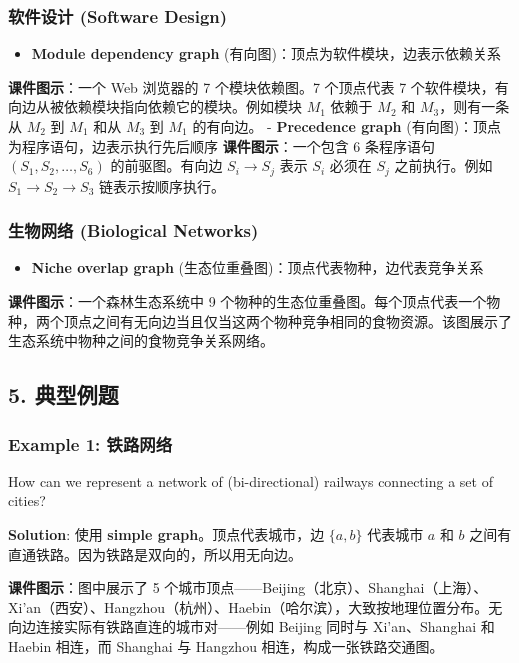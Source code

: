 \documentclass[10pt,a4paper,openany]{ctexbook}
\theoremstyle{definition}
\theoremstyle{remark}
\renewenvironment{quote}
  {\list{}{\leftmargin=1em\rightmargin=0pt\topsep=0.5pt\partopsep=0pt}\item[]}
  {\endlist}
\begin{document}
\subsubsection{软件设计 (Software Design)}

\begin{itemize}
\item \textbf{Module dependency graph} (有向图)：顶点为软件模块，边表示依赖关系
\end{itemize}

\begin{quote}
\textbf{课件图示}：一个 Web 浏览器的 7 个模块依赖图。7 个顶点代表 7 个软件模块，有向边从被依赖模块指向依赖它的模块。例如模块 $M_1$ 依赖于 $M_2$ 和 $M_3$，则有一条从 $M_2$ 到 $M_1$ 和从 $M_3$ 到 $M_1$ 的有向边。
- \textbf{Precedence graph} (有向图)：顶点为程序语句，边表示执行先后顺序
\textbf{课件图示}：一个包含 6 条程序语句 $(S_1,S_2,\ldots,S_6)$ 的前驱图。有向边 $S_i \to S_j$ 表示 $S_i$ 必须在 $S_j$ 之前执行。例如 $S_1 \to S_2 \to S_3$ 链表示按顺序执行。

\end{quote}

\subsubsection{生物网络 (Biological Networks)}

\begin{itemize}
\item \textbf{Niche overlap graph} (生态位重叠图)：顶点代表物种，边代表竞争关系
\end{itemize}

\begin{quote}
\textbf{课件图示}：一个森林生态系统中 9 个物种的生态位重叠图。每个顶点代表一个物种，两个顶点之间有无向边当且仅当这两个物种竞争相同的食物资源。该图展示了生态系统中物种之间的食物竞争关系网络。

\end{quote}
\vspace{-2pt}

\subsection{5. 典型例题}

\subsubsection{Example 1: 铁路网络}

\begin{quote}
How can we represent a network of (bi-directional) railways connecting a set of cities?

\textbf{Solution}: 使用 \textbf{simple graph}。顶点代表城市，边 $\{a, b\}$ 代表城市 $a$ 和 $b$ 之间有直通铁路。因为铁路是双向的，所以用无向边。

\textbf{课件图示}：图中展示了 5 个城市顶点——Beijing（北京）、Shanghai（上海）、Xi'an（西安）、Hangzhou（杭州）、Haebin（哈尔滨），大致按地理位置分布。无向边连接实际有铁路直连的城市对——例如 Beijing 同时与 Xi'an、Shanghai 和 Haebin 相连，而 Shanghai 与 Hangzhou 相连，构成一张铁路交通图。

\end{quote}
\end{document}
